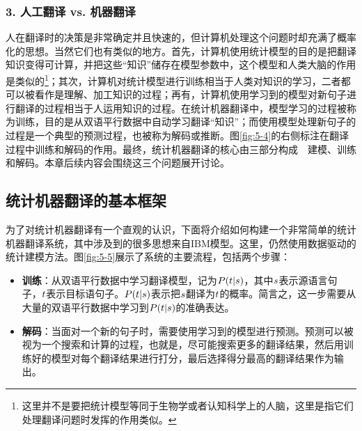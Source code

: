 \subsubsection{3. 人工翻译 vs. 机器翻译}
\parinterval 人在翻译时的决策是非常确定并且快速的，但计算机处理这个问题时却充满了概率化的思想。当然它们也有类似的地方。首先，计算机使用统计模型的目的是把翻译知识变得可计算，并把这些“知识”储存在模型参数中，这个模型和人类大脑的作用是类似的\footnote{这里并不是要把统计模型等同于生物学或者认知科学上的人脑，这里是指它们处理翻译问题时发挥的作用类似。}；其次，计算机对统计模型进行训练相当于人类对知识的学习，二者都可以被看作是理解、加工知识的过程；再有，计算机使用学习到的模型对新句子进行翻译的过程相当于人运用知识的过程。在统计机器翻译中，模型学习的过程被称为训练，目的是从双语平行数据中自动学习翻译“知识”；而使用模型处理新句子的过程是一个典型的预测过程，也被称为解码或推断。图\ref{fig:5-4}的右侧标注在翻译过程中训练和解码的作用。最终，统计机器翻译的核心由三部分构成\ \dash \ 建模、训练和解码。本章后续内容会围绕这三个问题展开讨论。


\subsection{统计机器翻译的基本框架}

\parinterval 为了对统计机器翻译有一个直观的认识，下面将介绍如何构建一个非常简单的统计机器翻译系统，其中涉及到的很多思想来自IBM模型。这里，仍然使用数据驱动的统计建模方法。图\ref{fig:5-5}展示了系统的主要流程，包括两个步骤：

\begin{itemize}
\vspace{0.5em}
\item {\small\sffamily\bfseries{训练}}：从双语平行数据中学习翻译模型，记为${P}({t}|{s})$，其中${s}$表示源语言句子，${t}$表示目标语句子。${P}({t}|{s})$表示把${s}$翻译为${t}$的概率。简言之，这一步需要从大量的双语平行数据中学习到${P}({t}|{s})$的准确表达。
\vspace{0.5em}
\item {\small\sffamily\bfseries{解码}}：当面对一个新的句子时，需要使用学习到的模型进行预测。预测可以被视为一个搜索和计算的过程，也就是，尽可能搜索更多的翻译结果，然后用训练好的模型对每个翻译结果进行打分，最后选择得分最高的翻译结果作为输出。
\vspace{0.5em}
\end{itemize}

